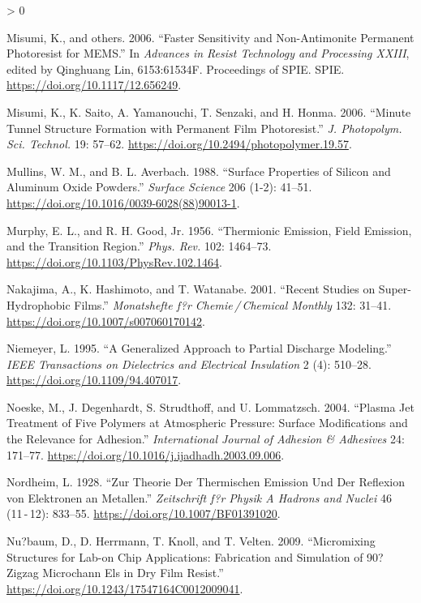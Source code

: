 \documentclass[
  10pt,
  twoside]{article}
\newlength{\cslhangindent}
\newenvironment{CSLReferences}[2] %
 {%
  \setlength{\parindent}{0pt}
  \ifodd #1 \everypar{\setlength{\hangindent}{\cslhangindent}}\ignorespaces\fi
  \ifnum #2 > 0
  \setlength{\parskip}{#2\baselineskip}
  \fi
 }%
 {}
\begin{document}
\begin{CSLReferences}{1}{0}
\leavevmode\hypertarget{ref-TOK06}{}%
Misumi, K., and others. 2006. {``Faster Sensitivity and Non-Antimonite Permanent Photoresist for {MEMS}.''} In \emph{Advances in Resist Technology and Processing XXIII}, edited by Qinghuang Lin, 6153:61534F. Proceedings of SPIE. SPIE. \url{https://doi.org/10.1117/12.656249}.

\leavevmode\hypertarget{ref-TOK06-2}{}%
Misumi, K., K. Saito, A. Yamanouchi, T. Senzaki, and H. Honma. 2006. {``Minute Tunnel Structure Formation with Permanent Film Photoresist.''} \emph{J. Photopolym. Sci. Technol.} 19: 57--62. \url{https://doi.org/10.2494/photopolymer.19.57}.

\leavevmode\hypertarget{ref-Mull1988}{}%
Mullins, W. M., and B. L. Averbach. 1988. {``Surface Properties of Silicon and Aluminum Oxide Powders.''} \emph{Surface Science} 206 (1-2): 41--51. \url{https://doi.org/10.1016/0039-6028(88)90013-1}.

\leavevmode\hypertarget{ref-Murp1956}{}%
Murphy, E. L., and R. H. Good, Jr. 1956. {``Thermionic Emission, Field Emission, and the Transition Region.''} \emph{Phys. Rev.} 102: 1464--73. \url{https://doi.org/10.1103/PhysRev.102.1464}.

\leavevmode\hypertarget{ref-Naka01}{}%
Nakajima, A., K. Hashimoto, and T. Watanabe. 2001. {``Recent Studies on Super-Hydrophobic Films.''} \emph{Monatshefte f?r Chemie / Chemical Monthly} 132: 31--41. \url{https://doi.org/10.1007/s007060170142}.

\leavevmode\hypertarget{ref-Niem1995}{}%
Niemeyer, L. 1995. {``A Generalized Approach to Partial Discharge Modeling.''} \emph{IEEE Transactions on Dielectrics and Electrical Insulation} 2 (4): 510--28. \url{https://doi.org/10.1109/94.407017}.

\leavevmode\hypertarget{ref-Noes04}{}%
Noeske, M., J. Degenhardt, S. Strudthoff, and U. Lommatzsch. 2004. {``Plasma Jet Treatment of Five Polymers at Atmospheric Pressure: Surface Modifications and the Relevance for Adhesion.''} \emph{International Journal of Adhesion \& Adhesives} 24: 171--77. \url{https://doi.org/10.1016/j.ijadhadh.2003.09.006}.

\leavevmode\hypertarget{ref-Nord1928}{}%
Nordheim, L. 1928. {``Zur Theorie Der Thermischen Emission Und Der Reflexion von Elektronen an Metallen.''} \emph{Zeitschrift f?r Physik A Hadrons and Nuclei} 46 (11 - 12): 833--55. \url{https://doi.org/10.1007/BF01391020}.

\leavevmode\hypertarget{ref-Nuss09}{}%
Nu?baum, D., D. Herrmann, T. Knoll, and T. Velten. 2009. {``Micromixing Structures for Lab-on Chip Applications: Fabrication and Simulation of 90? Zigzag Microchann Els in Dry Film Resist.''} \url{https://doi.org/10.1243/17547164C0012009041}.


\end{CSLReferences}
\end{document}
